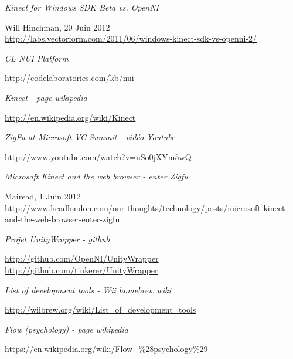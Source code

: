 \begin{thebibliography}{9}
  \emph{Kinect for Windows SDK Beta vs. OpenNI}\\
  \begin{small}
  Will Hinchman, 20 Juin 2012\\
  \url{http://labs.vectorform.com/2011/06/windows-kinect-sdk-vs-openni-2/}
  \end{small}
  
  \emph{CL NUI Platform}\\
  \begin{small}
  \url{http://codelaboratories.com/kb/nui}
  \end{small}
  
  \emph{Kinect - page wikipedia}\\
  \begin{small}
  \url{http://en.wikipedia.org/wiki/Kinect}
  \end{small}
  
  \emph{ZigFu at Microsoft VC Summit - vidéo Youtube}\\
  \begin{small}
  \url{http://www.youtube.com/watch?v=uSo0jXYm5wQ}
  \end{small}
  
  \emph{Microsoft Kinect and the web browser - enter Zigfu}\\
  \begin{small}
  Mairead, 1 Juin 2012\\
  \url{http://www.headlondon.com/our-thoughts/technology/posts/microsoft-kinect-and-the-web-browser-enter-zigfu}
  \end{small}
  
  \emph{Projet UnityWrapper - github}\\
  \begin{small}
  \url{http://github.com/OpenNI/UnityWrapper}\\
  \url{http://github.com/tinkerer/UnityWrapper}
  \end{small}
  
  \emph{List of development tools - Wii homebrew wiki}\\
  \begin{small}
  \url{http://wiibrew.org/wiki/List_of_development_tools}
  \end{small}
  
  \emph{Flow (psychology) - page wikipedia}\\
  \begin{small}
  \url{https://en.wikipedia.org/wiki/Flow_\%28psychology\%29}
  \end{small}
  

\end{thebibliography}
